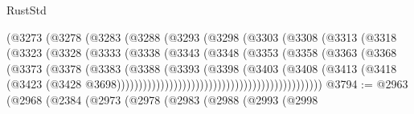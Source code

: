 \begin{lexlean}{RustStd}
\begin{coremodule}
{\begin{coremodule}
{{{{{{{{{{{{{{{{{{{{{{{{{{{{{{{{{{{{{{{{{{{{{{{{{{{{{{{{{{{{{{{{{{{{{{{{{{{{{{{{                                  (@3273
                                    (@3278
                                      (@3283
                                        (@3288
                                          (@3293
                                            (@3298
                                              (@3303
                                                (@3308
                                                  (@3313
                                                    (@3318
                                                      (@3323
                                                        (@3328
                                                          (@3333
                                                            (@3338
                                                              (@3343
                                                                (@3348
                                                                  (@3353
                                                                    (@3358
                                                                      (@3363
                                                                        (@3368
                                                                          (@3373
                                                                            (@3378
                                                                              (@3383
                                                                                (@3388
                                                                                  (@3393
                                                                                    (@3398
                                                                                      (@3403
                                                                                        (@3408
                                                                                          (@3413
                                                                                            (@3418
                                                                                              (@3423
                                                                                                (@3428
                                                                                                  @3698)))))))))))))))))))))))))))))))))))))))))))))))
@3794 := @2963
    (@2968
      (@2384
        (@2973
          (@2978
            (@2983
              (@2988
                (@2993
                  (@2998
}}}}}}}}}}}}}}}}}}}}}}}}}}}}}}}}}}}}}}}}}}}}}}}}}}}}}}}}}}}}}}}}}}}}}}}}}}}}}}}}
\end{coremodule}}
\end{coremodule}
\end{lexlean}
